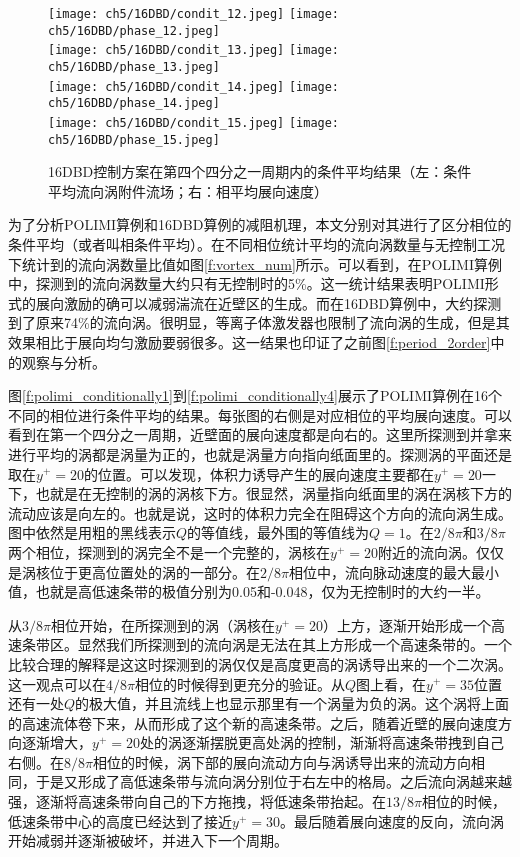 \begin{figure}[htb]
  \centering
  \texttt{[image: ch5/16DBD/condit\_12.jpeg]}
  \texttt{[image: ch5/16DBD/phase\_12.jpeg]}\\
  \texttt{[image: ch5/16DBD/condit\_13.jpeg]}
  \texttt{[image: ch5/16DBD/phase\_13.jpeg]}\\
  \texttt{[image: ch5/16DBD/condit\_14.jpeg]}
  \texttt{[image: ch5/16DBD/phase\_14.jpeg]}\\
  \texttt{[image: ch5/16DBD/condit\_15.jpeg]}
  \texttt{[image: ch5/16DBD/phase\_15.jpeg]}
  \caption{16DBD控制方案在第四个四分之一周期内的条件平均结果（左：条件平均流向涡附件流场；右：相平均展向速度）}\label{f:16DBD_conditional_4}
\end{figure}
为了分析POLIMI算例和16DBD算例的减阻机理，本文分别对其进行了区分相位的条件平均（或者叫相条件平均）。在不同相位统计平均的流向涡数量与无控制工况下统计到的流向涡数量比值如图\ref{f:vortex_num}所示。可以看到，在POLIMI算例中，探测到的流向涡数量大约只有无控制时的5\%。这一统计结果表明POLIMI形式的展向激励的确可以减弱湍流在近壁区的生成。而在16DBD算例中，大约探测到了原来74\%的流向涡。很明显，等离子体激发器也限制了流向涡的生成，但是其效果相比于展向均匀激励要弱很多。这一结果也印证了之前图\ref{f:period_2order}中的观察与分析。

图\ref{f:polimi_conditionally1}到\ref{f:polimi_conditionally4}展示了POLIMI算例在16个不同的相位进行条件平均的结果。每张图的右侧是对应相位的平均展向速度。可以看到在第一个四分之一周期，近壁面的展向速度都是向右的。这里所探测到并拿来进行平均的涡都是涡量为正的，也就是涡量方向指向纸面里的。探测涡的平面还是取在$y^+=20$的位置。可以发现，体积力诱导产生的展向速度主要都在$y^+=20$一下，也就是在无控制的涡的涡核下方。很显然，涡量指向纸面里的涡在涡核下方的流动应该是向左的。也就是说，这时的体积力完全在阻碍这个方向的流向涡生成。图中依然是用粗的黑线表示$Q$的等值线，最外围的等值线为$Q=1$。在$2/8\pi$和$3/8\pi$两个相位，探测到的涡完全不是一个完整的，涡核在$y^+=20$附近的流向涡。仅仅是涡核位于更高位置处的涡的一部分。在$2/8\pi$相位中，流向脉动速度的最大最小值，也就是高低速条带的极值分别为0.05和-0.048，仅为无控制时的大约一半。

从$3/8\pi$相位开始，在所探测到的涡（涡核在$y^+=20$）上方，逐渐开始形成一个高速条带区。显然我们所探测到的流向涡是无法在其上方形成一个高速条带的。一个比较合理的解释是这这时探测到的涡仅仅是高度更高的涡诱导出来的一个二次涡。这一观点可以在$4/8\pi$相位的时候得到更充分的验证。从$Q$图上看，在$y^+=35$位置还有一处$Q$的极大值，并且流线上也显示那里有一个涡量为负的涡。这个涡将上面的高速流体卷下来，从而形成了这个新的高速条带。之后，随着近壁的展向速度方向逐渐增大，$y^+=20$处的涡逐渐摆脱更高处涡的控制，渐渐将高速条带拽到自己右侧。在$8/8\pi$相位的时候，涡下部的展向流动方向与涡诱导出来的流动方向相同，于是又形成了高低速条带与流向涡分别位于右左中的格局。之后流向涡越来越强，逐渐将高速条带向自己的下方拖拽，将低速条带抬起。在$13/8\pi$相位的时候，低速条带中心的高度已经达到了接近$y^+=30$。最后随着展向速度的反向，流向涡开始减弱并逐渐被破坏，并进入下一个周期。

